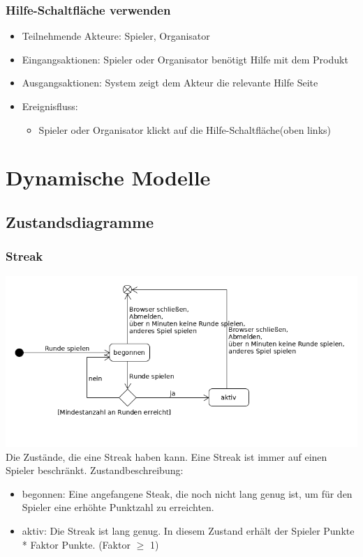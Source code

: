 \documentclass[a4paper]{scrreprt}
\begin{document}
       \subsection{Hilfe-Schaltfläche verwenden}
    \begin{itemize}
        \item Teilnehmende Akteure: \Gls{Spieler}, \Gls{Organisator}
        \item Eingangsaktionen: Spieler oder Organisator benötigt Hilfe mit dem Produkt
        \item Ausgangsaktionen: System zeigt dem Akteur die relevante Hilfe Seite
        \item Ereignisfluss:
            \begin{itemize}
                \item Spieler oder Organisator klickt auf die Hilfe-Schaltfläche(oben links)
            \end{itemize}
    \end{itemize}


    \chapter{Dynamische Modelle}
    \section{Zustandsdiagramme}
    \subsection{Streak}
    \label{fig:Streak_State}
    \includegraphics[width=\textwidth]{uml/export/Streak_Zustand.png}
    Die Zustände, die eine Streak haben kann. Eine Streak ist immer auf einen Spieler beschränkt.
    Zustandbeschreibung:
    \begin{itemize}
    \item begonnen: Eine angefangene Steak, die noch nicht lang genug ist, um für den Spieler eine erhöhte Punktzahl zu erreichten.
    \item aktiv: Die Streak ist lang genug. In diesem Zustand erhält der Spieler Punkte * Faktor Punkte. (Faktor $\geq$ 1)
    \end{itemize}
\end{document}
